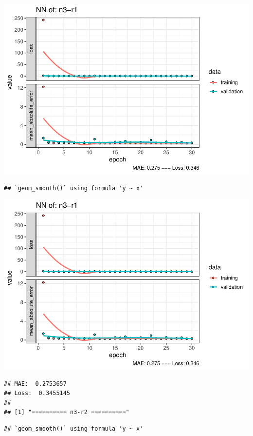 \documentclass[
]{article}
\begin{document}
\includegraphics{project-code_files/figure-latex/unnamed-chunk-18-23.pdf}

\begin{verbatim}
## `geom_smooth()` using formula 'y ~ x'
\end{verbatim}

\includegraphics{project-code_files/figure-latex/unnamed-chunk-18-24.pdf}

\begin{verbatim}
## MAE:  0.2753657
## Loss:  0.3455145 
## 
## [1] "========== n3-r2 =========="
\end{verbatim}

\begin{verbatim}
## `geom_smooth()` using formula 'y ~ x'
\end{verbatim}
\end{document}
